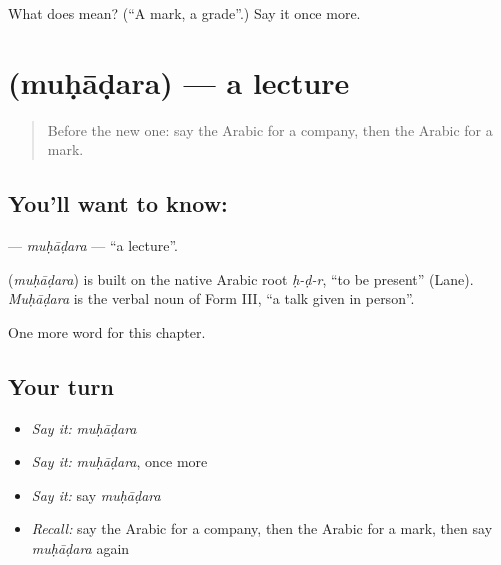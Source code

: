 \begin{tcolorbox}[breakable,colback=teal!4,colframe=teal!35!black,title={Before you move on}]
What does  mean? (\textquotedblleft{}A mark, a grade\textquotedblright{}.) Say it once more.
\end{tcolorbox}
\section[\texorpdfstring{\ar{محاضرة} (muḥāḍara)}{محاضرة (muḥāḍara)}]{ (muḥāḍara) — a lecture}

\label{lesson:AR-C252-muhadara}



\begin{quote}
Before the new one: say the Arabic for a company, then the Arabic for a mark.
\end{quote}

\subsection*{You'll want to know: }
\textbf{} — \emph{muḥāḍara} — \textquotedblleft{}a lecture\textquotedblright{}.

\begin{cousinweb}
\textbf{} (\emph{muḥāḍara}) is built on the native Arabic root \emph{ḥ-ḍ-r}, \textquotedblleft{}to be present\textquotedblright{} (Lane). \emph{Muḥāḍara} is the verbal noun of Form III, \textquotedblleft{}a talk given in person\textquotedblright{}.
\end{cousinweb}

\begin{grammarlens}[title={What you've built}]
One more word for this chapter.
\end{grammarlens}

\subsection*{Your turn}
\begin{itemize}
\raggedright
  \item \emph{Say it:} \emph{muḥāḍara}
  \item \emph{Say it:} \emph{muḥāḍara}, once more
  \item \emph{Say it:} say \emph{muḥāḍara}
  \item \emph{Recall:} say the Arabic for a company, then the Arabic for a mark, then say \emph{muḥāḍara} again
\end{itemize}

